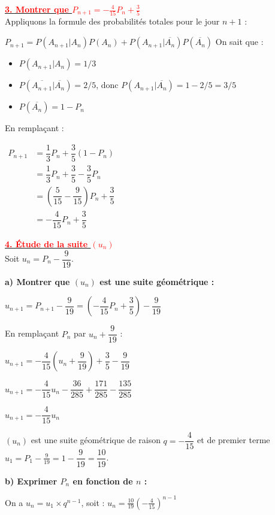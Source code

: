 \documentclass[12pt,a4paper]{article}
\begin{document}
\underline{\textbf{\textcolor{red}{3. Montrer que $P_{n+1} = -\frac{4}{15} P_n + \frac{3}{5}$}}}\\
Appliquons la formule des probabilités totales pour le jour $n+1$ :

$ P_{n+1} = P(A_{n+1} | A_n) P(A_n) + P(A_{n+1} | \overline{A_n}) P(\overline{A_n}) $
On sait que :
\begin{itemize}
    \item $P(A_{n+1} | A_n) = 1/3$
    \item $P(\overline{A_{n+1}} | \overline{A_n}) = 2/5$, donc $P(A_{n+1} | \overline{A_n}) = 1 - 2/5 = 3/5$
    \item $P(\overline{A_n}) = 1 - P_n$
\end{itemize}
En remplaçant :

$
 \begin{aligned}
 P_{n+1} &= \dfrac{1}{3} P_n + \dfrac{3}{5} (1 - P_n)\\
 &=\dfrac{1}{3} P_n + \dfrac{3}{5} - \dfrac{3}{5} P_n\\
&=\left( \dfrac{5}{15} - \dfrac{9}{15} \right) P_n + \dfrac{3}{5}\\
&=-\dfrac{4}{15} P_n + \dfrac{3}{5}
\end{aligned}
$

\underline{\textbf{\textcolor{red}{4. Étude de la suite $(u_n)$}}}\\
Soit $u_n = P_n - \dfrac{9}{19}$.

\textbf{a) Montrer que $(u_n)$ est une suite géométrique :}

$ u_{n+1} = P_{n+1} - \dfrac{9}{19} = \left( -\dfrac{4}{15} P_n + \dfrac{3}{5} \right) - \dfrac{9}{19} $

En remplaçant $P_n$ par $u_n + \dfrac{9}{19}$ :

$ u_{n+1} = -\dfrac{4}{15} \left( u_n + \dfrac{9}{19} \right) + \dfrac{3}{5} - \dfrac{9}{19} $

$ u_{n+1} = -\dfrac{4}{15} u_n - \dfrac{36}{285} + \dfrac{171}{285} - \dfrac{135}{285} $

$ u_{n+1} = -\dfrac{4}{15} u_n $

$(u_n)$ est une suite géométrique de raison $q = -\dfrac{4}{15}$ et de premier terme $u_1 = P_1 - \frac{9}{19} = 1 - \dfrac{9}{19} = \dfrac{10}{19}$.

\textbf{b) Exprimer $P_n$ en fonction de $n$ :}

    On a $u_n = u_1 \times q^{n-1}$, soit :
    $ u_n = \frac{10}{19} \left( -\frac{4}{15} \right)^{n-1} $
    
\end{document}

